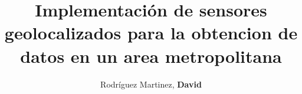 \documentclass[a4, nocrop, rm, castellano]{editorialupv}
\title{
	Implementación de sensores geolocalizados para la obtencion de datos en un area metropolitana
	}
\author{
	Rodríguez Martinez, \textbf{David}\\[2.5cm]
 \incluyeGrafico[width=0.4\textwidth]{Arduino}
}
\begin{document}

\ifcastellano %
	\renewcommand{\itemautorefname}{punto}
	\renewcommand{\sectionautorefname}{sección}
	\renewcommand{\subsectionautorefname}{subsección}
	\renewcommand{\subsubsectionautorefname}{subsección}
	\renewcommand{\figureautorefname}{figura}
	\renewcommand{\tableautorefname}{tabla}
	
	\renewcommand{\indexname}{Índice alfabético}
	\renewcommand{\bibname}{Bibliografía}
	\renewcommand{\contentsname}{Índice general}
	\renewcommand{\abstractname}{Resumen}	
\fi

\ifvalencia %
	\renewcommand{\itemautorefname}{punt}
	\renewcommand{\sectionautorefname}{secció}
	\renewcommand{\subsectionautorefname}{subsecció}
	\renewcommand{\subsubsectionautorefname}{subsecció}
	\renewcommand{\figureautorefname}{figura}
	\renewcommand{\tableautorefname}{taula}

	\renewcommand{\indexname}{Índex alfabètic}
	\renewcommand{\bibname}{Bibliografia}
	\renewcommand{\contentsname}{Índex}
	\renewcommand{\abstractname}{Resum}	
\fi


\frontmatter


\maketitle	




\ifEPUB
\else

	\tableofcontents
\fi

\end{document}
